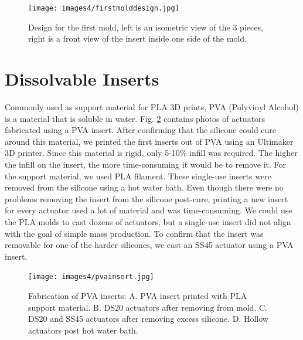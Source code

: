 \begin{figure}[h]
    \centering
    \texttt{[image: images4/firstmolddesign.jpg]}
    \caption{Design for the first mold, left is an isometric view of the 3 pieces, right is a front view of the insert inside one side of the mold.}
    \label{fig:firstmold}
\end{figure}

\clearpage
\section{Dissolvable Inserts}
Commonly used as support material for PLA 3D prints, PVA (Polyvinyl Alcohol) is a material that is soluble in water. Fig. \ref{fig:pvainsert} contains photos of actuators fabricated using a PVA insert. After confirming that the silicone could cure around this material, we printed the first inserts out of PVA using an Ultimaker 3D printer. Since this material is rigid, only 5-10\% infill was required. The higher the infill on the insert, the more time-consuming it would be to remove it. For the support material, we used PLA filament. These single-use inserts were removed from the silicone using a hot water bath. Even though there were no problems removing the insert from the silicone post-cure, printing a new insert for every actuator used a lot of material and was time-consuming. We could use the PLA molds to cast dozens of actuators, but a single-use insert did not align with the goal of simple mass production. To confirm that the insert was removable for one of the harder silicones, we cast an SS45 actuator using a PVA insert.  

\begin{figure}[h]
    \centering
    \texttt{[image: images4/pvainsert.jpg]}
    \caption{Fabrication of PVA inserts: A. PVA insert printed with PLA support material. B. DS20 actuators after removing from mold. C. DS20 and SS45 actuators after removing excess silicone. D. Hollow actuators post hot water bath.}
    \label{fig:pvainsert}
\end{figure}

\clearpage
